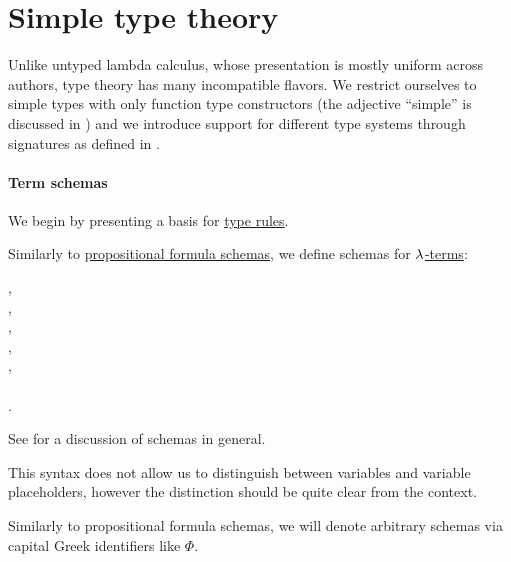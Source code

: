 \section{Simple type theory}\label{sec:simple_type_theory}

Unlike untyped lambda calculus, whose presentation is mostly uniform across authors, type theory has many incompatible flavors. We restrict ourselves to simple types with only function type constructors (the adjective \enquote{simple} is discussed in ) and we introduce support for different type systems through signatures as defined in .

\paragraph{Term schemas}\hfill

We begin by presenting a basis for \hyperref[def:simple_type_system]{type rules}.

\begin{definition}\label{def:lambda_term_schema}
  Similarly to \hyperref[def:propositional_formula_schema]{propositional formula schemas}, we define schemas for \hyperref[def:lambda_term]{\( \synlambda \)-terms}:
  \begin{bnf*}
     {}, \\
              { \bnfor {}}, \\
         {}, \\
       {\bnftsq{\( ( \)} \bnfsp {} \bnfsp {} \bnfsp \bnftsq{\( ) \)}}, \\
       {\bnftsq{\( ( \)} \bnfsp \bnftsq{\( \synlambda \)} \bnfsp {} \bnfsp {} \bnfsp {} \bnfsp \bnftsq{\( ) \)}}, \\
              { \bnfor {} \bnfor} \\
    .
  \end{bnf*}
\end{definition}
\begin{comments}
  \item See  for a discussion of schemas in general.

  \item This syntax does not allow us to distinguish between variables and variable placeholders, however the distinction should be quite clear from the context.

  \item Similarly to propositional formula schemas, we will denote arbitrary schemas via capital Greek identifiers like \( \Phi \).
\end{comments}

